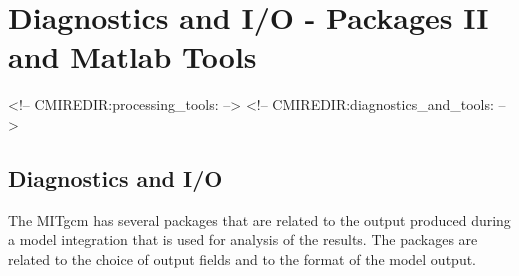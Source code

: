 
\chapter{Diagnostics and I/O - Packages II and Matlab Tools}
\begin{rawhtml}
<!-- CMIREDIR:processing_tools: -->
<!-- CMIREDIR:diagnostics_and_tools: -->
\end{rawhtml}

\section{Diagnostics and I/O}

The MITgcm has several packages that are related to the output
produced during a model integration that is used for analysis
of the results. The packages are related to the choice of output
fields and to the format of the model output.

\newpage


\newpage


\newpage


\newpage


\newpage


\newpage


